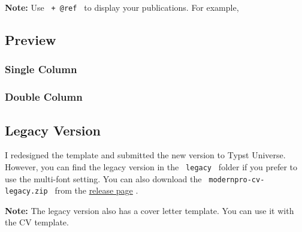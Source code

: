 \textbf{Note:} Use \texttt{\ +\ @ref\ } to display your publications.
For example,

\begin{Shaded}
\begin{Highlighting}[]


\end{Highlighting}
\end{Shaded}

\subsection{Preview}\label{preview}

\subsubsection{Single Column}\label{single-column}


\subsubsection{Double Column}\label{double-column}


\subsection{Legacy Version}\label{legacy-version}

I redesigned the template and submitted the new version to Typst
Universe. However, you can find the legacy version in the
\texttt{\ legacy\ } folder if you prefer to use the multi-font setting.
You can also download the \texttt{\ modernpro-cv-legacy.zip\ } from the
\href{https://github.com/jxpeng98/Typst-CV-Resume/releases}{release
page} .

\textbf{Note:} The legacy version also has a cover letter template. You
can use it with the CV template.

